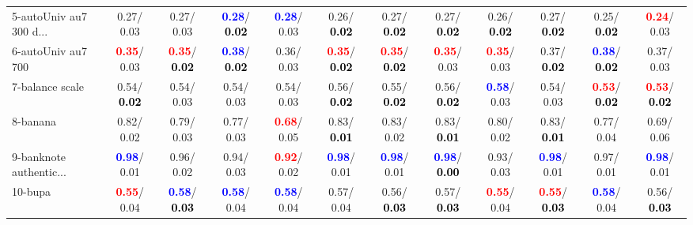 \begin{table}[h]
\begin{center}
{\begin{tabular}{lc|c|c|c|c|c|c|c|c|c|c}
5-autoUniv au7 300 d... &   0.27/  0.03 &   0.27/  0.03 & \textcolor{blue}{\textbf{  0.28}}/\textcolor{black}{\textbf{  0.02}} & \textcolor{blue}{\textbf{  0.28}}/  0.03 &   0.26/\textcolor{black}{\textbf{  0.02}} &   0.27/\textcolor{black}{\textbf{  0.02}} &   0.27/\textcolor{black}{\textbf{  0.02}} &   0.26/\textcolor{black}{\textbf{  0.02}} &   0.27/\textcolor{black}{\textbf{  0.02}} &   0.25/\textcolor{black}{\textbf{  0.02}} & \textcolor{red}{\textbf{  0.24}}/  0.03 \\
6-autoUniv au7 700 & \textcolor{red}{\textbf{  0.35}}/  0.03 & \textcolor{red}{\textbf{  0.35}}/\textcolor{black}{\textbf{  0.02}} & \textcolor{blue}{\textbf{  0.38}}/\textcolor{black}{\textbf{  0.02}} &   0.36/  0.03 & \textcolor{red}{\textbf{  0.35}}/\textcolor{black}{\textbf{  0.02}} & \textcolor{red}{\textbf{  0.35}}/\textcolor{black}{\textbf{  0.02}} & \textcolor{red}{\textbf{  0.35}}/  0.03 & \textcolor{red}{\textbf{  0.35}}/  0.03 &   0.37/\textcolor{black}{\textbf{  0.02}} & \textcolor{blue}{\textbf{  0.38}}/\textcolor{black}{\textbf{  0.02}} &   0.37/  0.03 \\
7-balance scale &   0.54/\textcolor{black}{\textbf{  0.02}} &   0.54/  0.03 &   0.54/  0.03 &   0.54/  0.03 &   0.56/\textcolor{black}{\textbf{  0.02}} &   0.55/\textcolor{black}{\textbf{  0.02}} &   0.56/\textcolor{black}{\textbf{  0.02}} & \textcolor{blue}{\textbf{  0.58}}/  0.03 &   0.54/  0.03 & \textcolor{red}{\textbf{  0.53}}/\textcolor{black}{\textbf{  0.02}} & \textcolor{red}{\textbf{  0.53}}/\textcolor{black}{\textbf{  0.02}} \\ \hline
8-banana &   0.82/  0.02 &   0.79/  0.03 &   0.77/  0.03 & \textcolor{red}{\textbf{  0.68}}/  0.05 &   0.83/\textcolor{black}{\textbf{  0.01}} &   0.83/  0.02 &   0.83/\textcolor{black}{\textbf{  0.01}} &   0.80/  0.02 &   0.83/\textcolor{black}{\textbf{  0.01}} &   0.77/  0.04 &   0.69/  0.06 \\
9-banknote authentic... & \textcolor{blue}{\textbf{  0.98}}/  0.01 &   0.96/  0.02 &   0.94/  0.03 & \textcolor{red}{\textbf{  0.92}}/  0.02 & \textcolor{blue}{\textbf{  0.98}}/  0.01 & \textcolor{blue}{\textbf{  0.98}}/  0.01 & \textcolor{blue}{\textbf{  0.98}}/\textcolor{black}{\textbf{  0.00}} &   0.93/  0.03 & \textcolor{blue}{\textbf{  0.98}}/  0.01 &   0.97/  0.01 & \textcolor{blue}{\textbf{  0.98}}/  0.01 \\
10-bupa & \textcolor{red}{\textbf{  0.55}}/  0.04 & \textcolor{blue}{\textbf{  0.58}}/\textcolor{black}{\textbf{  0.03}} & \textcolor{blue}{\textbf{  0.58}}/  0.04 & \textcolor{blue}{\textbf{  0.58}}/  0.04 &   0.57/  0.04 &   0.56/\textcolor{black}{\textbf{  0.03}} &   0.57/\textcolor{black}{\textbf{  0.03}} & \textcolor{red}{\textbf{  0.55}}/  0.04 & \textcolor{red}{\textbf{  0.55}}/\textcolor{black}{\textbf{  0.03}} & \textcolor{blue}{\textbf{  0.58}}/  0.04 &   0.56/\textcolor{black}{\textbf{  0.03}} \\

\end{tabular}}
\end{center}
\end{table}
